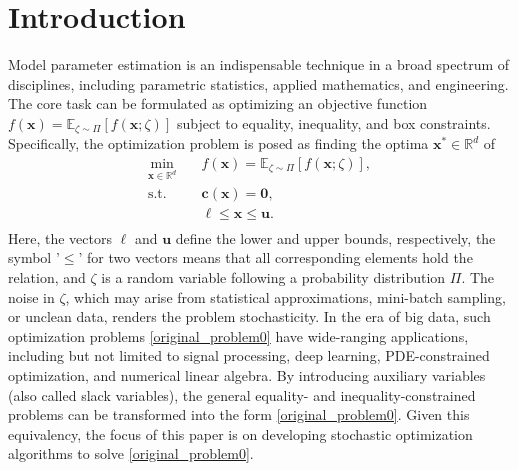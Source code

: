 \documentclass[aos]{imsart}
\numberwithin{equation}{section}
\theoremstyle{plain}
\begin{document}
\section{Introduction}
Model parameter estimation is an indispensable technique in a broad spectrum of disciplines, including parametric statistics, applied mathematics, and engineering. The core task can be formulated as optimizing an objective function $f(\bm{x}) = \mathbb{E}_{\zeta \sim \Pi} \left[ f(\bm{x}; \zeta) \right]$ subject to equality, inequality, and box constraints. Specifically, the optimization problem is posed as finding the optima $\bm{x}^{*} \in \mathbb{R}^{d}$ of 
\begin{equation}
\label{original_problem0}
    \begin{split}
        \min_{\bm{x} \in \mathbb{R}^{d}} & \hspace{1em} f(\bm{x}) = \mathbb{E}_{\zeta \sim \Pi} \left[ f(\bm{x}; \zeta) \right], \\
        \text{s.t.} & \hspace{1em} \bm{c}(\bm{x}) = \bm{0},\\
        & \hspace{1em} \bm{\ell} \leq \bm{x} \leq \bm{u}. \\
    \end{split}
\end{equation}
Here, the vectors $\bm{\ell}$ and $\bm{u}$ define the lower and upper bounds, respectively, the symbol '$\leq$' for two vectors means that all corresponding elements hold the relation, and $\zeta$ is a random variable following a probability distribution $\Pi$. The noise in $\zeta$, which may arise from statistical approximations, mini-batch sampling, or unclean data, renders the problem stochasticity. 
In the era of big data, such optimization problems \eqref{original_problem0} have wide-ranging applications, including but not limited to signal processing, deep learning, PDE-constrained optimization, and numerical linear algebra.
By introducing auxiliary variables (also called slack variables), the general equality- and inequality-constrained problems can be transformed into the form \eqref{original_problem0}.
Given this equivalency, the focus of this paper is on developing stochastic optimization algorithms to solve \eqref{original_problem0}.
\end{document}
